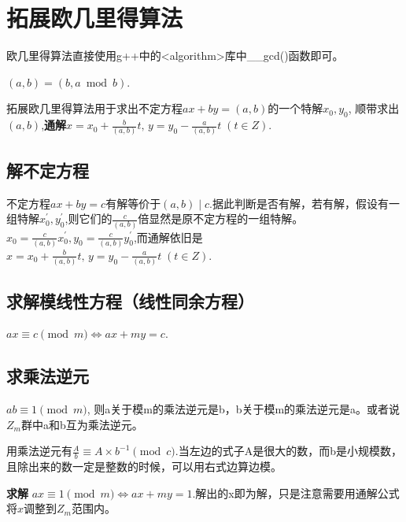 \section{拓展欧几里得算法}
	\par 欧几里得算法直接使用g++中的<algorithm>库中\_\_gcd()函数即可。
	\par $(a,b)=(b,a \bmod b)$.
	\par 拓展欧几里得算法用于求出不定方程$ax+by=(a,b)$的一个特解$x_0,y_0$, 顺带求出$(a,b)$,{\bfseries 通解$x=x_0+\frac{b}{(a,b)}t,\,y=y_0-\frac{a}{(a,b)}t \; (t \in Z)$}.
	\subsection{解不定方程}
		\par 不定方程$ax+by=c$有解等价于$(a,b) \mid c$.据此判断是否有解，若有解，假设有一组特解$x_0^{'},y_0^{'}$,则它们的$\frac{c}{(a,b)}$倍显然是原不定方程的一组特解。$x_0=\frac{c}{(a,b)}x_0^{'},y_0=\frac{c}{(a,b)}y_0^{'}$,而通解依旧是$x=x_0+\frac{b}{(a,b)}t,\,y=y_0-\frac{a}{(a,b)}t \; (t \in Z)$.
	\subsection{求解模线性方程（线性同余方程）}
		$ax \equiv c\pmod{m} \Longleftrightarrow ax+my=c$.
	\subsection{求乘法逆元}
		\par $ab \equiv 1 \pmod{m}$, 则a关于模m的乘法逆元是b，b关于模m的乘法逆元是a。或者说$Z_m$群中a和b互为乘法逆元。
		\par 用乘法逆元有$\frac{A}{b} \equiv A \times b^{-1} \pmod{c}$.当左边的式子A是很大的数，而b是小规模数，且除出来的数一定是整数的时候，可以用右式边算边模。
		\par \textbf{求解} $ax \equiv 1 \pmod{m} \Longleftrightarrow ax+my= 1$.解出的x即为解，只是注意需要用通解公式将$x$调整到$Z_m$范围内。
